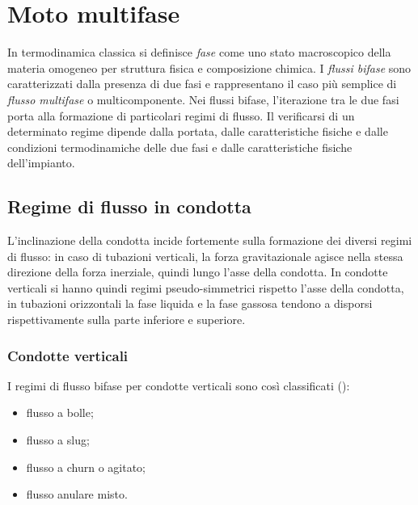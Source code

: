 \section{Moto multifase}
In termodinamica classica si definisce \textit{fase} come uno stato macroscopico della materia omogeneo per struttura fisica e composizione chimica. I \textit{flussi bifase} sono caratterizzati dalla presenza di due fasi e rappresentano il caso più semplice di \textit{flusso multifase} o multicomponente. Nei flussi bifase, l'iterazione tra le due fasi porta alla formazione di particolari regimi di flusso. Il verificarsi di un determinato regime dipende dalla portata, dalle caratteristiche fisiche e dalle condizioni termodinamiche delle due fasi e dalle caratteristiche fisiche dell'impianto.

\subsection{Regime di flusso in condotta}
L'inclinazione della condotta incide fortemente sulla formazione dei diversi regimi di flusso: in caso di tubazioni verticali, la forza gravitazionale agisce nella stessa direzione della forza inerziale, quindi lungo l'asse della condotta. In condotte verticali si hanno quindi regimi pseudo-simmetrici rispetto l'asse della condotta, in tubazioni orizzontali la fase liquida e la fase gassosa tendono a disporsi rispettivamente sulla parte inferiore e superiore. 

\subsubsection{Condotte verticali} \label{sssec:verticali}
I regimi di flusso bifase per condotte verticali sono così classificati ():
\begin{itemize}
    \item flusso a bolle;
    \item flusso a slug;
    \item flusso a churn o agitato;
    \item flusso anulare misto.
\end{itemize}

